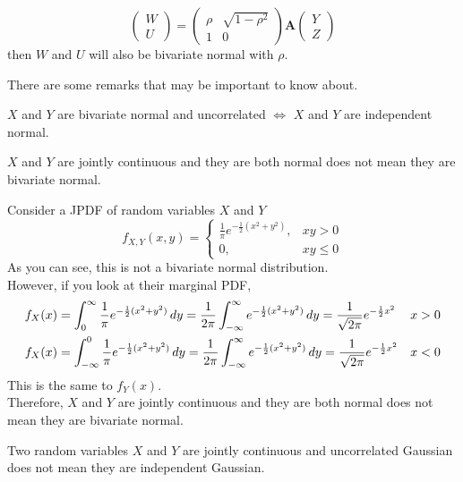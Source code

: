 \documentclass{huhtakm-template-book}
\begin{document}
\begin{eg}
	\begin{equation*}
		\begin{pmatrix}
			W\\
			U
		\end{pmatrix}=\begin{pmatrix}
			\rho & \sqrt{1-\rho^{2}}\\
			1 & 0
		\end{pmatrix}\mathbf{A}\begin{pmatrix}
			Y\\
			Z
		\end{pmatrix}
	\end{equation*}
	then $W$ and $U$ will also be bivariate normal with $\rho$.
\end{eg}
There are some remarks that may be important to know about.
\begin{rem}
	$X$ and $Y$ are bivariate normal and uncorrelated $\iff$ $X$ and $Y$ are independent normal.
\end{rem}
\begin{rem}
	$X$ and $Y$ are jointly continuous and they are both normal does not mean they are bivariate normal.
\end{rem}
\begin{eg}
	Consider a JPDF of random variables $X$ and $Y$
	\begin{equation*}
		f_{X,Y}(x,y)=\begin{cases}
			\frac{1}{\pi}e^{-\frac{1}{2}(x^{2}+y^{2})}, &xy>0\\
			0, &xy\leq 0
		\end{cases}
	\end{equation*}
	As you can see, this is not a bivariate normal distribution.\\
	However, if you look at their marginal PDF,
	\begin{align*}
		f_{X}(x)&=\int_{0}^{\infty}\frac{1}{\pi}e^{-\frac{1}{2}(x^{2}+y^{2})}\,dy=\frac{1}{2\pi}\int_{-\infty}^{\infty} e^{-\frac{1}{2}(x^{2}+y^{2})}\,dy=\frac{1}{\sqrt{2\pi}}e^{-\frac{1}{2}x^{2}} & x&>0\\
		f_{X}(x)&=\int_{-\infty}^{0}\frac{1}{\pi}e^{-\frac{1}{2}(x^{2}+y^{2})}\,dy=\frac{1}{2\pi}\int_{-\infty}^{\infty} e^{-\frac{1}{2}(x^{2}+y^{2})}\,dy=\frac{1}{\sqrt{2\pi}}e^{-\frac{1}{2}x^{2}} & x&<0
	\end{align*}
	This is the same to $f_{Y}(x)$.\\
	Therefore, $X$ and $Y$ are jointly continuous and they are both normal does not mean they are bivariate normal.
\end{eg}
\begin{rem}
	Two random variables $X$ and $Y$ are jointly continuous and uncorrelated Gaussian does not mean they are independent Gaussian.
\end{rem}
\end{document}
